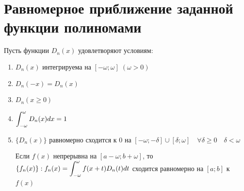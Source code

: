 \section{Равномерное приближение заданной функции полиномами}

\begin{theorem}
    Пусть функции $D_n(x)$ удовлетворяют условиям:

    \begin{enumerate}
        \item $D_n(x)$ интегрируема на $[-\omega; \omega] \; (\omega > 0)$
        \item $D_n(-x) = D_n(x)$
        \item $D_n(x \geq 0)$
        \item $\displaystyle\int_{-\omega}^\omega D_n(x) dx = 1$
        \item 
            $\{ D_n(x) \}$ равномерно сходится к $0$ на 
            $[-\omega; -\delta] \cup [\delta; \omega] \quad
            \forall \delta \geq 0 \quad \delta < \omega$

            Если $f(x)$ непрерывна на $[a - \omega; b + \omega]$, то
            $\{ f_n(x) \} : f_n(x) = 
            \displaystyle\int_{-\omega}^\omega f(x + t) D_n(t) dt$ сходится равномерно 
            на $[a; b]$ к $f(x)$
    \end{enumerate}
\end{theorem}

